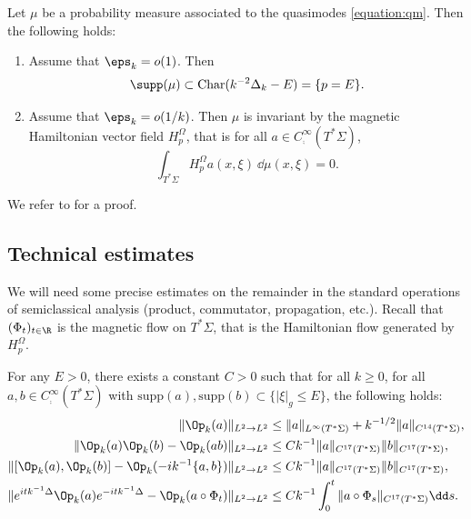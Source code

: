 \begin{proposition}
\label{proposition:scl-measure}
Let $\mu$ be a probability measure associated to the quasimodes \eqref{equation:qm}. Then the following holds:
\begin{enumerate}

\item\label{proposition:scl-measurei} Assume that $\eps_k = o(1)$. Then
\[
\supp(\mu) \subset \mathrm{Char}(k^{-2}\Delta_k-E) = \{p=E\}.
\]

\item\label{proposition:scl-measureii} Assume that $\eps_k = o(1/k)$. Then $\mu$ is invariant by the magnetic Hamiltonian vector field $H_{p}^\Omega$, that is for all $a \in C^\infty_{{\comp}}(T^*\Sigma)$,
\[
\int_{T^*\Sigma} H_{p}^\Omega a(x,\xi) ~\dd\mu(x,\xi) = 0.
\]
\end{enumerate}
\end{proposition}

We refer to \cite[App.\,E.3]{Dyatlov-Zworski-book} for a proof.

\subsection{Technical estimates}

We will need some precise estimates on the remainder in the standard operations of semiclassical analysis (product, commutator, propagation, etc.). Recall that $(\Phi_t)_{t \in \R}$ is the magnetic flow on $T^*\Sigma$, that is the Hamiltonian flow generated by $H_p^\Omega$.

\begin{proposition} For any $E>0$, there exists a constant $C > 0$ such that for all $k \geq 0$, for all $a,b \in
C^\infty_{\comp}(T^*\Sigma)$ with $\mathrm{supp}(a), \mathrm{supp}(b) \subset
\{|\xi|_g \leq E\}$, the following holds:
\begin{align}
\label{equation:calderon-fine}
\|\Op_k(a)\|_{L^2 \to L^2} & \leq \|a\|_{L^\infty(T^*\Sigma)} + k^{-1/2}\|a\|_{C^{14}(T^*\Sigma)}, \\
\label{equation:product-fine}
\|\Op_k(a)\Op_k(b)-\Op_k(ab)\|_{L^2 \to L^2} &\leq Ck^{-1} \|a\|_{C^{17}(T^*\Sigma)}\|b\|_{C^{17}(T^*\Sigma)}, \\
\label{equation:commutator-fine}
\|[\Op_k(a),\Op_k(b)]-\Op_k(-ik^{-1}\{a,b\})\|_{L^2 \to L^2} &\leq Ck^{-1}\|a\|_{C^{17}(T^*\Sigma)}\|b\|_{C^{17}(T^*\Sigma)}, \\
\label{equation:egorov-fine}
\|e^{it k^{-1} \Delta} \Op_k(a) e^{-itk^{-1}\Delta}-\Op_k(a \circ \Phi_t)\|_{L^2 \to L^2} &\leq C k^{-1} \int_0^t \|a \circ \Phi_s\|_{C^{17}(T^*\Sigma)} \dd s.
\end{align}

\end{proposition}

